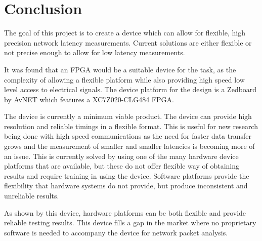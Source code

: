 \section{Conclusion}

The goal of this project is to create a device which can allow for flexible, high precision network
latency measurements. Current solutions are either flexible or not precise enough to allow for low
latency measurements.

It was found that an FPGA would be a suitable device for the task, as the complexity of allowing a
flexible platform while also providing high speed low level access to electrical signals. The device
platform for the design is a Zedboard by AvNET which features a XC7Z020-CLG484 FPGA.

The device is currently a minimum viable product. The device can provide high resolution and
reliable timings in a flexible format. This is useful for new research being done with high speed
communications as the need for faster data transfer grows and the measurement of smaller and
smaller latencies is becoming more of an issue. This is currently solved by using one of the many
hardware device platforms that are available, but these do not offer flexible way of obtaining results
and require training in using the device. Software platforms provide the flexibility that hardware
systems do not provide, but produce inconsistent and unreliable results.

As shown by this device, hardware platforms can be both flexible and provide reliable testing results.
This device fills a gap in the market where no proprietary software is needed to accompany the
device for network packet analysis.
